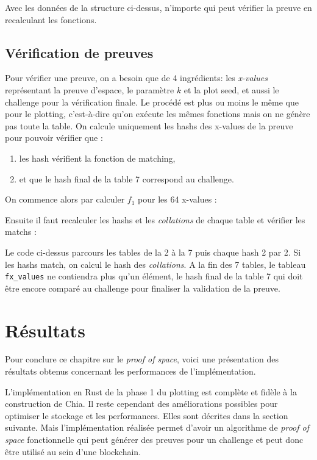 Avec les données de la structure ci-dessus, n'importe qui peut vérifier la preuve en recalculant les fonctions.

\subsection{Vérification de preuves}

Pour vérifier une preuve, on a besoin que de 4 ingrédients: les \emph{x-values} représentant la preuve d'espace, le paramètre $k$ et la plot seed, et aussi le challenge pour la vérification finale. Le procédé est plus ou moins le même que pour le plotting, c'est-à-dire qu'on exécute les mêmes fonctions mais on ne génère pas toute la table. On calcule uniquement les hashs des x-values de la preuve pour pouvoir vérifier que :

\begin{enumerate}
  \item les hash vérifient la fonction de matching,
  \item et que le hash final de la table 7 correspond au challenge.
\end{enumerate}

On commence alors par calculer $f_1$ pour les 64 x-values :


\newpage

Ensuite il faut recalculer les hashs et les \emph{collations} de chaque table et vérifier les matchs :


Le code ci-dessus parcours les tables de la 2 à la 7 puis chaque hash 2 par 2. Si les hashs match, on calcul le hash des \emph{collations}. A la fin des 7 tables, le tableau \verb|fx_values| ne contiendra plus qu'un élément, le hash final de la table 7 qui doit être encore comparé au challenge pour finaliser la validation de la preuve. 

\newpage
\section{Résultats}

Pour conclure ce chapitre sur le \emph{proof of space}, voici une présentation des résultats obtenus concernant les performances de l'implémentation.

L'implémentation en Rust de la phase 1 du plotting est complète et fidèle à la construction \cite{chia:construction} de Chia. Il reste cependant des améliorations possibles pour optimiser le stockage et les performances. Elles sont décrites dans la section suivante. Mais l'implémentation réalisée permet d'avoir un algorithme de \emph{proof of space} fonctionnelle qui peut générer des preuves pour un challenge et peut donc être utilisé au sein d'une blockchain.

